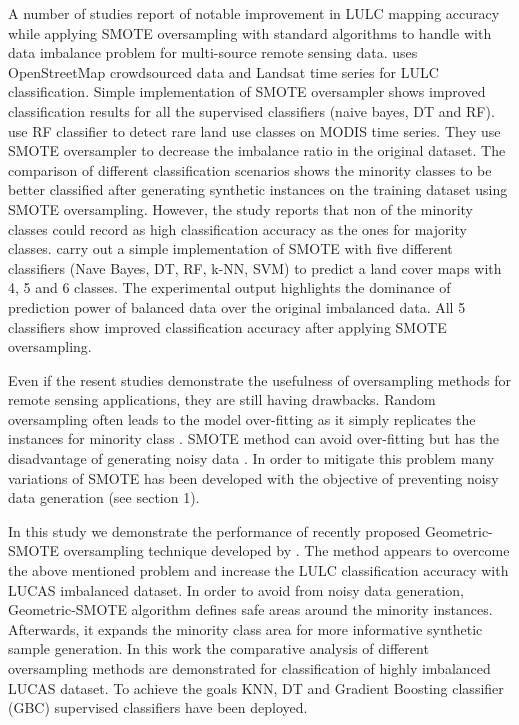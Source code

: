 \documentclass[parskip=full]{scrartcl}
\begin{document}
A number of studies report of notable improvement in LULC mapping accuracy
while applying SMOTE oversampling with standard algorithms to handle with data
imbalance problem for multi-source remote sensing data. \cite{Johnson2016}
uses OpenStreetMap crowdsourced data and Landsat time series for LULC
classification. Simple implementation of SMOTE oversampler shows improved
classification results for all the supervised classifiers (naive bayes, DT and
RF). \cite{Bogner2018} use RF classifier to detect rare land use classes on
MODIS time series. They use SMOTE oversampler to decrease the imbalance ratio
in the original dataset. The comparison of different classification scenarios
shows the minority classes to be better classified after generating synthetic
instances on the training dataset using SMOTE oversampling. However, the study
reports that non of the minority classes could record as high classification
accuracy as the ones for majority classes. \cite{Panda2018} carry out a simple
implementation of SMOTE with five different classifiers (Nave Bayes, DT, RF,
k-NN, SVM) to predict a land cover maps with 4, 5 and 6 classes. The
experimental output highlights the dominance of prediction power of balanced
data over the original imbalanced data. All 5 classifiers show improved
classification accuracy after applying SMOTE oversampling.

Even if the resent studies demonstrate the usefulness of oversampling methods
for remote sensing applications, they are still having drawbacks. Random
oversampling often leads to the model over-fitting as it simply replicates the
instances for minority class \cite{Feng2019}. SMOTE method can avoid
over-fitting but has the disadvantage of generating noisy data \cite{He2008}.
In order to mitigate this problem many variations of SMOTE has been developed
with the objective of preventing noisy data generation (see section 1).

In this study we demonstrate the performance of recently proposed
Geometric-SMOTE oversampling technique developed by \cite{Douzas2019}. The
method appears to overcome the above mentioned problem and increase the LULC
classification accuracy with LUCAS imbalanced dataset. In order to avoid from
noisy data generation, Geometric-SMOTE algorithm defines safe areas around the
minority instances. Afterwards, it expands the minority class area for more
informative synthetic sample generation. In this work the comparative analysis
of different oversampling methods are demonstrated for classification of highly
imbalanced LUCAS dataset. To achieve the goals KNN, DT and Gradient Boosting
classifier (GBC) supervised classifiers have been deployed.
\end{document}
